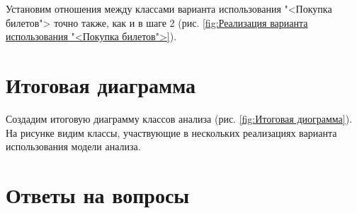 Установим отношения между классами варианта использования "<Покупка билетов">
точно также, как и в шаге 2 (рис. \ref{fig:Реализация варианта использования "<Покупка билетов">}).

\section{Итоговая диаграмма}
Создадим итоговую диаграмму классов анализа (рис. \ref{fig:Итоговая диограмма}).
На рисунке видим классы, участвующие в нескольких реализациях варианта
использования модели анализа.

\newpage

\section*{Ответы на вопросы}

